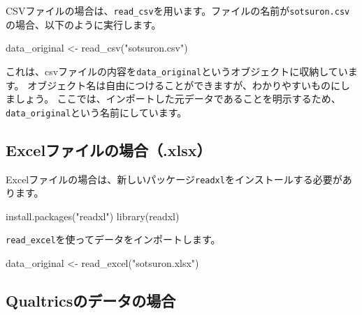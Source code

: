 \documentclass[
]{book}
\newenvironment{Shaded}{\begin{snugshade}}{\end{snugshade}}
\newcommand{\FunctionTok}[1]{\textcolor[rgb]{0.00,0.00,0.00}{#1}}
\newcommand{\NormalTok}[1]{#1}
\newcommand{\OtherTok}[1]{\textcolor[rgb]{0.56,0.35,0.01}{#1}}
\newcommand{\StringTok}[1]{\textcolor[rgb]{0.31,0.60,0.02}{#1}}
\begin{document}
CSVファイルの場合は、\texttt{read\_csv}を用います。ファイルの名前が\texttt{sotsuron.csv}の場合、以下のように実行します。

\begin{Shaded}
\begin{Highlighting}[]
\NormalTok{data\_original }\OtherTok{\textless{}{-}} \FunctionTok{read\_csv}\NormalTok{(}\StringTok{"sotsuron.csv"}\NormalTok{)}
\end{Highlighting}
\end{Shaded}

これは、csvファイルの内容を\texttt{data\_original}というオブジェクトに収納しています。
オブジェクト名は自由につけることができますが、わかりやすいものにしましょう。
ここでは、インポートした元データであることを明示するため、\texttt{data\_original}という名前にしています。

\hypertarget{excelux30d5ux30a1ux30a4ux30ebux306eux5834ux5408.xlsx}{%
\subsection{Excelファイルの場合（.xlsx）}\label{excelux30d5ux30a1ux30a4ux30ebux306eux5834ux5408.xlsx}}

Excelファイルの場合は、新しいパッケージ\texttt{readxl}をインストールする必要があります。

\begin{Shaded}
\begin{Highlighting}[]
\FunctionTok{install.packages}\NormalTok{(}\StringTok{"readxl"}\NormalTok{)}
\FunctionTok{library}\NormalTok{(readxl)}
\end{Highlighting}
\end{Shaded}

\texttt{read\_excel}を使ってデータをインポートします。

\begin{Shaded}
\begin{Highlighting}[]
\NormalTok{data\_original }\OtherTok{\textless{}{-}} \FunctionTok{read\_excel}\NormalTok{(}\StringTok{"sotsuron.xlsx"}\NormalTok{)}
\end{Highlighting}
\end{Shaded}

\hypertarget{qualtricsux306eux30c7ux30fcux30bfux306eux5834ux5408}{%
\subsection{Qualtricsのデータの場合}\label{qualtricsux306eux30c7ux30fcux30bfux306eux5834ux5408}}
\end{document}
